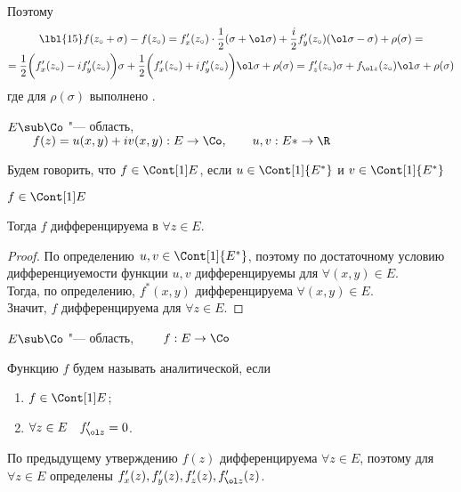 Поэтому
\begin{multline}\lbl{15}
	f(z_\circ + \sigma) - f(z_\circ) = f_x'(z_\circ) \cdot \frac12 (\sigma + \ol \sigma) + \frac i2 f_y'(z_\circ)(\ol \sigma - \sigma) + \rho(\sigma) = \\
	= \frac12 \bigg( f_x'(z_\circ) - if_y'(z_\circ) \bigg) \sigma + \frac12 \bigg( f_x'(z_\circ) + if_y'(z_\circ) \bigg) \ol \sigma + \rho(\sigma) = f_z'(z_\circ) \sigma + f_{\ol z}(z_\circ) \ol \sigma + \rho(\sigma)
\end{multline}
где для $ \rho(\sigma) $ выполнено .

\begin{definition}
	$ E \sub \Co $ "--- область, $ \qquad f(z) = u(x, y) + iv(x, y) : E \to \Co, \qquad u, v : E* \to \R $

	Будем говорить, что $ f \in \Cont[1] E $, если $ u \in \Cont[1]{E^*} $ и $ v \in \Cont[1]{E^*} $
\end{definition}

\begin{statement}
	$ f \in \Cont[1] E $

	Тогда $ f $ дифференцируема в $ \forall z \in E $.
\end{statement}

\begin{proof}
	По определению $ u, v \in \Cont[1]{E^*} $, поэтому по достаточному условию дифференциуемости функции $ u, v $ дифференцируемы для $ \forall (x, y) \in E $. \\
	Тогда, по определению, $ f^*(x, y) $ дифференцируема $ \forall (x, y) \in E $. \\
	Значит, $ f $ дифференцируема для $ \forall z \in E $.
\end{proof}

\begin{definition}
	$ E \sub \Co $ "--- область, $ \qquad f : E \to \Co $

	Функцию $ f $ будем называть аналитической, если
	\begin{enumerate}
		\item $ f \in \Cont[1]E $;
		\item $ \forall z \in E \quad f_{\ol z}' = 0 $.
	\end{enumerate}
\end{definition}

\begin{remark}
	По предыдущему утверждению $ f(z) $ дифференцируема $ \forall z \in E $, поэтому для $ \forall z \in E $ определены $ f_x'(z), f_y'(z), f_z'(z), f_{\ol z}'(z) $.
\end{remark}

